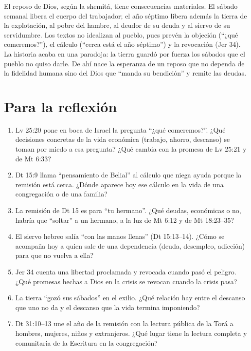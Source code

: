 \documentclass[11pt,letterpaper]{article}
\begin{document}
El reposo de Dios, según la shemitá, tiene consecuencias materiales. El sábado semanal libera el cuerpo del trabajador; el año séptimo libera además la tierra de la explotación, al pobre del hambre, al deudor de su deuda y al siervo de su servidumbre. Los textos no idealizan al pueblo, pues prevén la objeción (``¿qué comeremos?''), el cálculo (``cerca está el año séptimo'') y la revocación (Jer 34). La historia acaba en una paradoja: la tierra guardó por fuerza los sábados que el pueblo no quiso darle. De ahí nace la esperanza de un reposo que no dependa de la fidelidad humana sino del Dios que ``manda su bendición'' y remite las deudas.

\section{Para la reflexión}

\begin{enumerate}
\item Lv 25:20 pone en boca de Israel la pregunta ``¿qué comeremos?''. ¿Qué decisiones concretas de la vida económica (trabajo, ahorro, descanso) se toman por miedo a esa pregunta? ¿Qué cambia con la promesa de Lv 25:21 y de Mt 6:33?
\item Dt 15:9 llama ``pensamiento de Belial'' al cálculo que niega ayuda porque la remisión está cerca. ¿Dónde aparece hoy ese cálculo en la vida de una congregación o de una familia?
\item La remisión de Dt 15 es para ``tu hermano''. ¿Qué deudas, económicas o no, habría que ``soltar'' a un hermano, a la luz de Mt 6:12 y de Mt 18:23--35?
\item El siervo hebreo salía ``con las manos llenas'' (Dt 15:13--14). ¿Cómo se acompaña hoy a quien sale de una dependencia (deuda, desempleo, adicción) para que no vuelva a ella?
\item Jer 34 cuenta una libertad proclamada y revocada cuando pasó el peligro. ¿Qué promesas hechas a Dios en la crisis se revocan cuando la crisis pasa?
\item La tierra ``gozó sus sábados'' en el exilio. ¿Qué relación hay entre el descanso que uno no da y el descanso que la vida termina imponiendo?
\item Dt 31:10--13 une el año de la remisión con la lectura pública de la Torá a hombres, mujeres, niños y extranjeros. ¿Qué lugar tiene la lectura completa y comunitaria de la Escritura en la congregación?
\end{enumerate}
\end{document}
